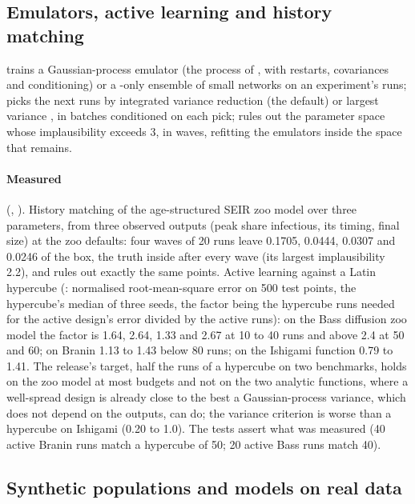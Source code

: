 \subsection{Emulators, active learning and history matching}
\label{sec:emulate}

 trains a Gaussian-process emulator (the process of
, with restarts, covariances and conditioning) or a -only
ensemble of small networks on an experiment's runs;  picks the next runs
by integrated variance reduction (the default) or largest variance \citep{mackay1992information},
in batches conditioned on each pick;  \citep{vernon2010galaxy,
andrianakis2015bayesian} rules out the parameter space whose implausibility exceeds 3, in
waves, refitting the emulators inside the space that remains.

\paragraph{Measured} (, ). History matching of the
age-structured SEIR zoo model over three parameters, from three observed outputs (peak share
infectious, its timing, final size) at the zoo defaults: four waves of 20 runs leave 0.1705,
0.0444, 0.0307 and 0.0246 of the box, the truth inside after every wave (its largest
implausibility 2.2), and  rules out exactly the same points.
Active learning against a Latin hypercube (:
normalised root-mean-square error on 500 test points, the hypercube's median of three seeds,
the factor being the hypercube runs needed for the active design's error divided by the
active runs): on the Bass diffusion zoo model the factor is 1.64, 2.64, 1.33 and 2.67 at 10
to 40 runs and above 2.4 at 50 and 60; on Branin \citep{dixon1978towards} 1.13 to 1.43 below
80 runs; on the Ishigami function 0.79 to 1.41. The release's target, half the runs of a
hypercube on two benchmarks, holds on the zoo model at most budgets and not on the two
analytic functions, where a well-spread design is already close to the best a
Gaussian-process variance, which does not depend on the outputs, can do; the variance
criterion is worse than a hypercube on Ishigami (0.20 to 1.0). The tests assert what was
measured (40 active Branin runs match a hypercube of 50; 20 active Bass runs match 40).

\subsection{Synthetic populations and models on real data}
\label{sec:population}

